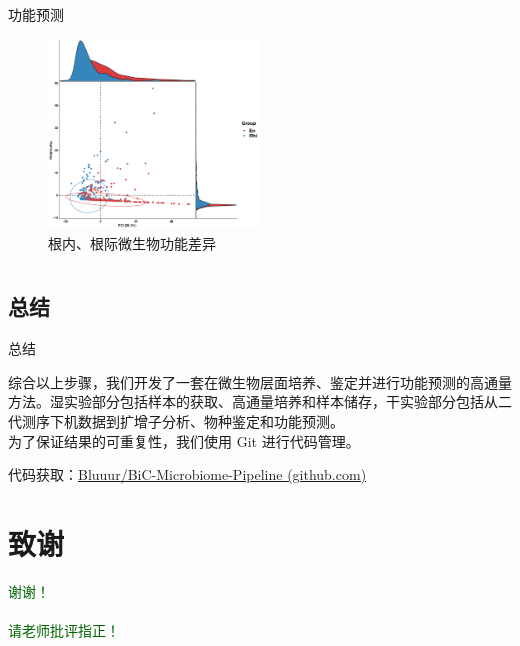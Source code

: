 \documentclass[UTF8]{ctexbeamer}
\begin{document}
\begin{frame}{功能预测}
	
	\begin{figure}
		\centering
		\includegraphics[width=0.5\textwidth]{img/PCA_KO.pdf}
		\caption{根内、根际微生物功能差异}
	\end{figure}

\end{frame}

	\section*{}
	\subsection*{总结}
	\begin{frame}{总结}

		\qquad 综合以上步骤，我们开发了一套在微生物层面培养、鉴定并进行功能预测的高通量方法。湿实验部分包括样本的获取、高通量培养和样本储存，干实验部分包括从二代测序下机数据到扩增子分析、物种鉴定和功能预测。
		\newline\\

		为了保证结果的可重复性，我们使用 Git 进行代码管理。
		
		代码获取：\href{https://github.com/Bluuur/BiC-Microbiome-Pipeline}{Bluuur/BiC-Microbiome-Pipeline (github.com)}
	
	\end{frame}


	\section*{致谢}  
	\begin{frame}
		\begin{center}
			\textcolor{darkGreen}{\huge {谢谢！\\ \quad \\ 请老师批评指正！}}
		\end{center}
	\end{frame}
\end{document}
